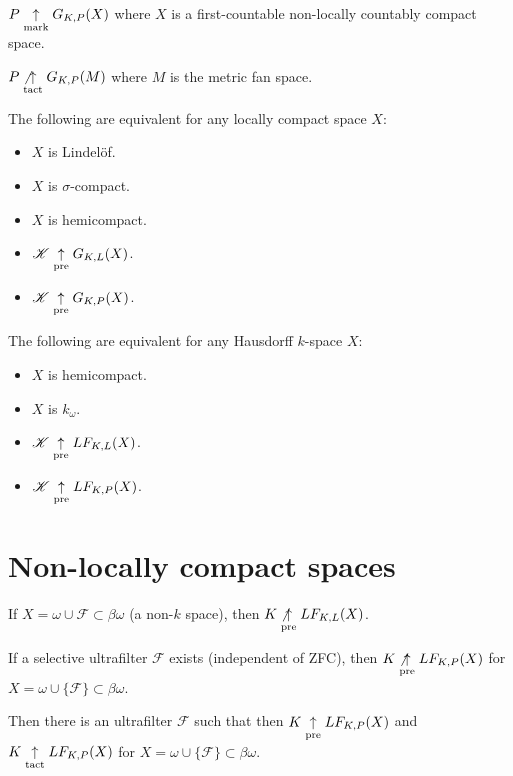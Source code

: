 \begin{thm}
  $P \underset{\text{mark}}{\uparrow} G_{K,P}(X)$ where $X$ is a first-countable non-locally
  countably compact space.
\end{thm}

\begin{thm}
  $P \not\underset{\text{tact}}{\uparrow} G_{K,P}(M)$ where $M$ is the metric fan space.
\end{thm}

\begin{thm}
  The following are equivalent for any locally compact space $X$:
    \begin{itemize}
      \item $X$ is Lindel\"of.
      \item $X$ is $\sigma$-compact.
      \item $X$ is hemicompact.
      \item $\mathscr{K} \underset{\text{pre}}{\uparrow} G_{K,L}(X)$.
      \item $\mathscr{K} \underset{\text{pre}}{\uparrow} G_{K,P}(X)$.
    \end{itemize}
\end{thm}

\begin{thm}
  The following are equivalent for any Hausdorff $k$-space $X$:
    \begin{itemize}
      \item $X$ is hemicompact.
      \item $X$ is $k_{\omega}$.
      \item $\mathscr{K} \underset{\text{pre}}{\uparrow} LF_{K,L}(X)$.
      \item $\mathscr{K} \underset{\text{pre}}{\uparrow} LF_{K,P}(X)$.
    \end{itemize}
\end{thm}

\section{Non-locally compact spaces}

\begin{prop}
  If $X=\omega\cup\mathcal{F}\subset\beta\omega$ (a non-$k$ space),
  then $K\not\underset{\text{pre}}{\uparrow} LF_{K,L}(X)$.
\end{prop}

\begin{prop}
  If a selective ultrafilter $\mathcal{F}$ exists (independent of ZFC),
  then $K \not\underset{\text{pre}}{\uparrow} LF_{K,P}(X)$
  for $X=\omega \cup \{\mathcal{F}\}\subset \beta\omega$.
\end{prop}

\begin{thm}
  Then there is an ultrafilter $\mathcal{F}$ such that
  then $K \underset{\text{pre}}{\uparrow} LF_{K,P}(X)$ and $K \underset{\text{tact}}{\uparrow} LF_{K,P}(X)$
  for $X=\omega \cup \{\mathcal{F}\}\subset \beta\omega$.
\end{thm}

